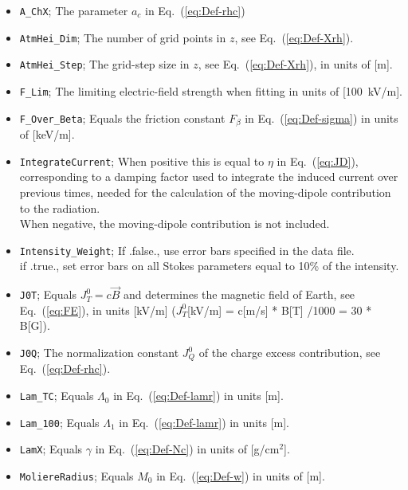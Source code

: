 \documentclass[pdftex,dvipsnames,usenames,fleqn,12pt]{article}
\def\eqref#1{Eq.~(\ref{eq:#1})}
\begin{document}
\begin{itemize}
\item{\verb<A_ChX<}; The parameter $a_c$ in \eqref{Def-rhc}

\item{\verb<AtmHei_Dim<}; The number of grid points in $z$, see \eqref{Def-Xrh}.

\item{\verb<AtmHei_Step<};  The grid-step size in $z$, see \eqref{Def-Xrh}, in units of [m].

\item{\verb<F_Lim<};  The limiting electric-field strength when fitting in units of [100~kV/m].

\item{\verb<F_Over_Beta<}; Equals the friction constant $F_\beta$ in \eqref{Def-sigma} in units of [keV/m].

\item{\verb<IntegrateCurrent<}; When positive this is equal to $\eta$ in \eqref{JD}, corresponding to a damping factor used to integrate the induced current over previous times, needed for the calculation of the moving-dipole contribution to the radiation.
    \\ When negative, the moving-dipole contribution is not included.

\item{\verb<Intensity_Weight<}; If .false., use error bars specified in the data file.
\\ if .true., set error bars on all Stokes parameters equal to 10\% of the intensity.

\item{\verb<J0T<}; Equals $J^0_T=c \vec{B}$ and determines the magnetic field of Earth, see \eqref{FE}, in units [kV/m] ($J^0_T$[kV/m] = c[m/s] * B[T] /1000 = 30 * B[G]).

\item{\verb<J0Q<}; The normalization constant $J^0_Q$ of the charge excess contribution, see \eqref{Def-rhc}.

\item{\verb<Lam_TC<}; Equals $\Lambda_0$ in \eqref{Def-lamr} in units [m].
\item{\verb<Lam_100<}; Equals $\Lambda_1$ in \eqref{Def-lamr} in units [m].

\item{\verb<LamX<}; Equals $\gamma$ in \eqref{Def-Nc} in units of [g/cm$^2$].

\item{\verb<MoliereRadius<}; Equals $M_0$ in \eqref{Def-w} in units of [m].


\end{itemize}
\end{document}
